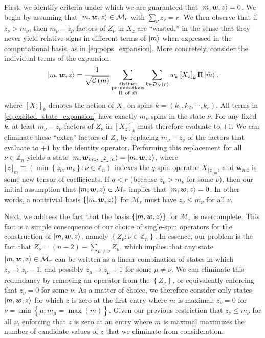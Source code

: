 \documentclass[nofootinbib,notitlepage,11pt]{revtex4-2}
\renewcommand{\t}{\text} %
\newcommand{\f}[2]{\dfrac{#1}{#2}} %
\newcommand{\p}[1]{\left(#1\right)} %
\renewcommand{\sp}[1]{\left[#1\right]} %
\renewcommand{\set}[1]{\left\{#1\right\}} %
\newcommand{\m}{\bm} %
\newcommand{\1}{\mathds{1}}
\newcommand{\C}{\mathcal{C}}
\newcommand{\D}{\mathcal{D}}
\newcommand{\M}{\mathcal{M}}
\newcommand{\ZZ}{\mathbb{Z}}
\newcommand{\floor}[1]{\lfloor{#1}\rfloor}
\begin{document}
First, we identify criteria under which we are guaranteed that $\ket{m,\m w,z}=0$.
We begin by assuming that $\ket{m,\m w,z}\in\M_r$ with $\sum_\nu z_\nu=r$.
We then observe that if $z_\nu>m_\nu$, then $m_\nu-z_\nu$ factors of $Z_\nu$ in $X_z$ are ``wasted,'' in the sense that they never yield relative signs in different terms of $\ket{m}$ when expressed in the computational basis, as in \eqref{eq:pops_expansion}.
More concretely, consider the individual terms of the expansion
\begin{align}
  \ket{m,\m w,z}
  = \f1{\sqrt{\C\p{m}}}
  \sum_{\substack{\t{distinct}\\\t{permutations}\\\Pi~\t{of}~\tilde m}}
  \sum_{k\in\D_N\p{r}} w_k \sp{X_z}_k \Pi \ket{\tilde m},
  \label{eq:excited_state_expansion}
\end{align}
where $\sp{X_z}_k$ denotes the action of $X_z$ on spins $k=\p{k_1,k_2,\cdots,k_r}$.
All terms in \eqref{eq:excited_state_expansion} have exactly $m_\nu$ spins in the state $\nu$.
For any fixed $k$, at least $m_\nu-z_\nu$ factors of $Z_\nu$ in $\sp{X_z}_k$ must therefore evaluate to $+1$.
We can eliminate these ``extra'' factors of $Z_\nu$ by replacing $m_\nu-z_\nu$ of the factors that evaluate to $+1$ by the identity operator.
Performing this replacement for all $\nu\in\ZZ_n$ yields a state $\ket{m,\m w_{mz},{\floor{z}_m}}=\ket{m,\m w,z}$, where $\floor{z}_m\equiv\p{\min\set{z_\nu,m_\nu}:\nu\in\ZZ_n}$ indexes the $q$-spin operator $X_{\floor{z}_m}$, and $\m w_{mz}$ is some new tensor of coefficients.
If $q<r$ (because $z_\nu>m_\nu$ for some $\nu$), then our initial assumption that $\ket{m,\m w,z}\in\M_r$ implies that $\ket{m,\m w,z}=0$.
In other words, a nontrivial basis $\set{\ket{m,\m w,z}}$ for $\M_r$ must have $z_\nu\le m_\nu$ for all $\nu$.

Next, we address the fact that the basis $\set{\ket{m,\m w,z}}$ for $\M_r$ is overcomplete.
This fact is a simple consequence of our choice of single-spin operators for the construction of $\ket{m,\m w,z}$, namely $\set{Z_\nu:\nu\in\ZZ_n}$.
In essence, our problem is the fact that $Z_\nu=\p{n-2}-\sum_{\mu\ne\nu}Z_\mu$, which implies that any state $\ket{m,\m w,z}\in\M_r$ can be written as a linear combination of states in which $z_\nu\to z_\nu-1$, and possibly $z_\mu\to z_\mu+1$ for some $\mu\ne\nu$.
We can eliminate this redundancy by removing an operator from the $\set{Z_\nu}$, or equivalently enforcing that $z_\nu=0$ for some $\nu$.
As a matter of choice, we therefore consider only states $\ket{m,\m w,z}$ for which $z$ is zero at the first entry where $m$ is maximal: $z_\nu=0$ for $\nu=\min\set{\mu:m_\mu=\max\p{m}}$.
Given our previous restriction that $z_\nu\le m_\nu$ for all $\nu$, enforcing that $z$ is zero at an entry where $m$ is maximal maximizes the number of candidate values of $z$ that we eliminate from consideration.
\end{document}
